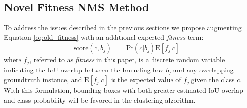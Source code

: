 \documentclass[10pt,twocolumn,letterpaper]{article}
\begin{document}
\subsection{Novel Fitness NMS Method}

To address the issues described in the previous sections we propose augmenting Equation \ref{eq:old_fitness} with an additional expected \textit{fitness} term:
\begin{align}
\label{eq:fitness}
\mathrm{score}(c,b_j) &=  \mathrm{Pr}(c | b_j) \mathrm{E} \left [ f_j | c \right] 
\end{align}
where $f_j$, referred to as \textit{fitness} in this paper, is a discrete random variable indicating the IoU overlap between the bounding box $b_j$ and any overlapping groundtruth instance, and $\mathrm{E}[f_j|c]$ is the expected value of $f_j$ given the class $c$. With this formulation, bounding boxes with both greater estimated IoU overlap and class probability will be favored in the clustering algorithm. 
\end{document}
